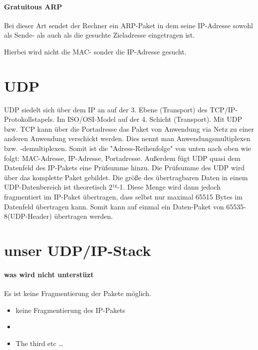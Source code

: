\paragraph{Gratuitous ARP}
Bei dieser Art sendet der Rechner ein ARP-Paket in dem seine IP-Adresse sowohl als Sende- als auch als die gesuchte Zieladresse eingetragen ist.

Hierbei wird nicht die MAC- sonder die IP-Adresse gesucht.

\section{UDP}
UDP siedelt sich über dem IP an auf der 3. Ebene (Transport) des TCP/IP-Protokollstapels.
Im ISO/OSI-Model auf der 4. Schicht (Transport).
Mit UDP bzw. TCP kann über die Portadresse das Paket von Anwendung via Netz zu einer anderen Anwendung verschickt werden.
Dies nennt man Anwendungsmultiplexen bzw. -demultiplexen.
Somit ist die "Adress-Reihenfolge" von unten nach oben wie folgt: MAC-Adresse, IP-Adresse, Portadresse.
Außerdem fügt UDP quasi dem Datenfeld des IP-Pakets eine Prüfsumme hinzu.
Die Prüfsumme des UDP wird über das komplette Paket gebildet.
Die größe des übertragbaren Daten in einem UDP-Datenbereich ist theoretisch 2¹⁶-1.
Diese Menge wird dann jedoch fragmentiert im IP-Paket übertragen, dass selbst nur maximal 65515 Bytes im Datenfeld übertragen kann.
Somit kann auf einmal ein Daten-Paket von 65535-8(UDP-Header) übertragen werden.

\section{unser UDP/IP-Stack}

\paragraph{ was wird nicht unterstüzt }
Es ist keine Fragmentierung der Pakete möglich.

\begin{itemize}
  \item keine Fragmentierung des IP-Pakets
  \item 
  \item The third etc \ldots
\end{itemize}

